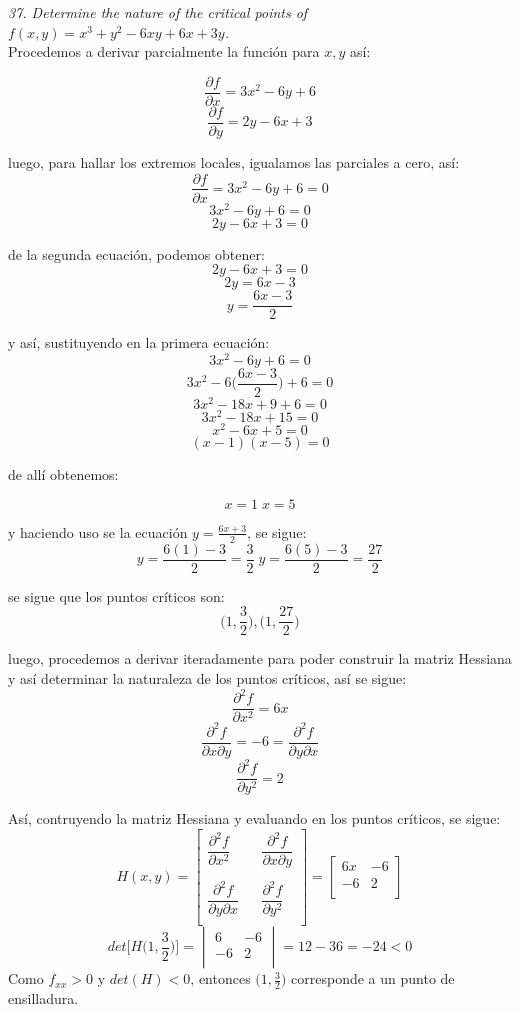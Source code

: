 \documentclass[a4paper,12pt]{article}
\begin{document}
\textit{37. Determine the nature of the critical points of
			$f (x, y) = x^3 + y^2 - 6xy + 6x + 3y$.}\\

			Procedemos a derivar parcialmente la función para $x, y$ así:

				$$ \frac{\partial f}{\partial x} = 3x^2 - 6y + 6$$
				$$ \frac{\partial f}{\partial y} = 2y -6x + 3$$

			luego, para hallar los extremos locales, igualamos las parciales a cero, así:
				$$ \frac{\partial f}{\partial x} = 3x^2 - 6y + 6 = 0$$
				$$ 3x^2 - 6y + 6 = 0$$
				$$ 2y -6x + 3 = 0$$

			de la segunda ecuación, podemos obtener:
				$$  2y -6x + 3 = 0 $$
				$$  2y = 6x - 3 $$
				$$  y = \frac{6x - 3}{2} $$

			y así, sustituyendo en la primera ecuación:
				$$ 3x^2 - 6y + 6 = 0 $$
				$$ 3x^2 - 6\Big(\frac{6x - 3}{2}\Big) + 6 = 0 $$
				$$ 3x^2 - 18x + 9 + 6 = 0 $$
				$$ 3x^2 - 18x + 15 = 0 $$
				$$ x^2 - 6x + 5 = 0 $$
				$$ (x-1)(x-5) = 0 $$

			de allí obtenemos:

				$$ x = 1 \; x = 5$$

			y haciendo uso se la ecuación $ y = \frac{6x + 3}{2} $, se sigue:
				$$ y = \frac{6(1) - 3}{2} = \frac{3}{2} \; y = \frac{6(5) - 3}{2} = \frac{27}{2} $$

			se sigue que los puntos críticos son:
				$$ \Big( 1, \frac{3}{2} \Big), \Big( 1, \frac{27}{2} \Big)  $$

			luego, procedemos a derivar iteradamente para poder construir la matriz Hessiana
			y así determinar la naturaleza de los puntos críticos, así se sigue:
				$$ \frac{\partial^2 f}{\partial x^2} = 6x $$
				$$ \frac{\partial^2 f}{\partial x \partial y } = -6
				 = \frac{\partial^2 f}{\partial y \partial x } $$
				$$ \frac{\partial^2 f}{\partial y^2} = 2$$

			Así, contruyendo la matriz Hessiana y evaluando en los puntos críticos, se sigue:
				$$H(x,y) = \begin{bmatrix}
						\dfrac{\partial^2f}{\partial x^2} & & \dfrac{\partial^2f}{\partial x\partial y} \\
						& & \\
						\dfrac{\partial^2f}{\partial y\partial x}&  & \dfrac{\partial^2f}{\partial y^2} \\
						\end{bmatrix} =
						\begin{bmatrix}
							6x & -6 \\
							-6  & 2 \\
						\end{bmatrix}
						$$
				$$det \Big[H \Big(1, \frac{3}{2}\Big)\Big] =
						\begin{vmatrix}
							6 & -6 \\
							-6  & 2 \\
						\end{vmatrix} = 12 - 36 = - 24 < 0
				$$
				Como $f_{xx} > 0$ y $det(H) < 0$, entonces $\Big(1, \frac{3}{2}\Big)$ corresponde a un
				punto de ensilladura.\\
\end{document}

